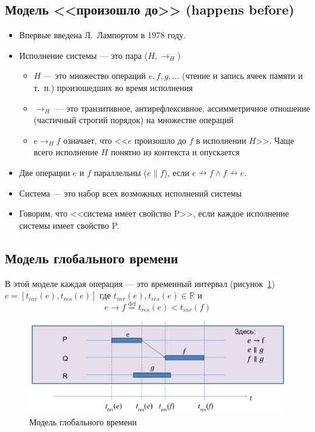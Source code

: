 \documentclass[10pt,a4paper,oneside,titlepage]{article}
\theoremstyle{plain}
\theoremstyle{defenition}
\begin{document}
\subsection{Модель <<произошло до>> (happens before)}
\begin{itemize}
	\item Впервые введена Л.~Лампортом в 1978 году.
	\item Исполнение системы --- это пара ($H, \to_H$)
	\begin{itemize}
		\item $H$ --- это множество операций $e, f, g, \ldots$ (чтение и запись ячеек памяти и т.~п.) произошедших во время исполнения
		\item $\to_H$ --- это транзитивное, антирефлексивное, ассимметричное отношение (частичный строгий порядок) на множестве операций
		\item $e\to_Hf$ означает, что <<$e$ произошло до $f$ в исполнении $H$>>. Чаще всего исполнение $H$ понятно из контекста и опускается 
	\end{itemize}
    \item Две операции $e$ и $f$ параллельны ($e\parallel f$), если $e\nrightarrow f\wedge f\nrightarrow e$.
    \item Система --- это набор всех возможных исполнений системы
    \item Говорим, что <<система имеет свойство P>>, если каждое исполнение системы имеет свойство P.
\end{itemize}

\subsection{Модель глобального времени}

В этой моделе каждая операция --- это временный интервал (рисунок~\ref{fig:model3}) $e=[t_{inv}(e), t_{res}(e)]$ где $t_{inv}(e), t_{res}(e)\in\mathbb{R}$ и
$$
e\to f\stackrel{\mathrm{def}}{=}t_{res}(e)<t_{inv}(f)
$$

\begin{figure}
	\centering
	\includegraphics[width=0.5\linewidth]{pictures/Model3}
	\caption{Модель глобального времени}
	\label{fig:model3}
\end{figure}
\end{document}
